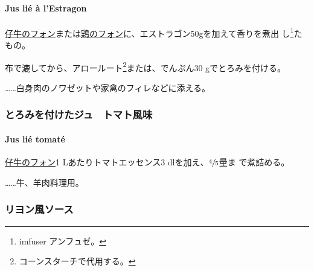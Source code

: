 \hypertarget{jus-lie-a-lestragon}{%
\paragraph{Jus lié à l'Estragon}\label{jus-lie-a-lestragon}}


\protect\hyperlink{fonds-de-veau-brun}{仔牛のフォン}または\protect\hyperlink{fonds-de-volaille}{鶏のフォン}に、エストラゴン50gを加えて香りを煮出
し\footnote{imfuser アンフュゼ。}たもの。

布で漉してから、アロールート\footnote{コーンスターチで代用する。}または、でんぷん30
gでとろみを付ける。

\ldots{}\ldots{}白身肉のノワゼットや家禽のフィレなどに添える。

\maeaki

\hypertarget{ux3068ux308dux307fux3092ux4ed8ux3051ux305fux30b8ux30e5ux30c8ux30deux30c8ux98a8ux5473}{%
\subsubsection{とろみを付けたジュ　トマト風味}\label{ux3068ux308dux307fux3092ux4ed8ux3051ux305fux30b8ux30e5ux30c8ux30deux30c8ux98a8ux5473}}

\hypertarget{jus-lie-tomate}{%
\paragraph{Jus lié tomaté}\label{jus-lie-tomate}}


\protect\hyperlink{fonds-de-veau-brun}{仔牛のフォン}1
Lあたりトマトエッセンス3 dlを加え、\(\sfrac{4}{5}\)量ま で煮詰める。

\ldots{}\ldots{}牛、羊肉料理用。

\maeaki

\hypertarget{ux30eaux30e8ux30f3ux98a8ux30bdux30fcux30b9}{%
\subsubsection{リヨン風ソース}\label{ux30eaux30e8ux30f3ux98a8ux30bdux30fcux30b9}}

